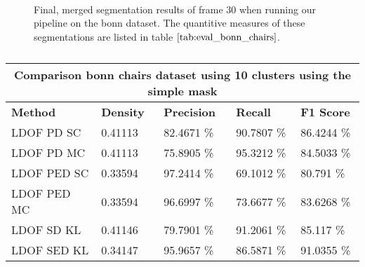 \begin{figure}[H]
\begin{center}
~
~
\end{center}
\caption[Simple Merged Segments Bonn Chairs]{Final, merged segmentation results of frame 30 when running our pipeline on the bonn dataset. The quantitive measures of these segmentations are listed in table $\ref{tab:eval_bonn_chairs}$.}
\label{fig:eval_bonn_chairs_c_10_simple}
\end{figure}

\begin{table}[H]
\centering
\begin{tabular}{|l|l|l|l|l|}
\hline
\multicolumn{5}{|c|}{Comparison bonn chairs dataset using 10 clusters using the simple mask}                        \\ \hline
\textbf{Method} & \textbf{Density} & \textbf{Precision} & \textbf{Recall} & \textbf{F1 Score} \\ \hline
LDOF PD SC & 0.41113 & 82.4671 \%   & 90.7807 \%     & 86.4244 \% \\ \hline
LDOF PD MC & 0.41113 & 75.8905 \%   & 95.3212 \%     & 84.5033 \%  \\ \hline
LDOF PED SC & 0.33594 & 97.2414 \%   & 69.1012 \%     & 80.791 \%  \\ \hline
LDOF PED MC & 0.33594 & 96.6997 \%   & 73.6677 \%     & 83.6268 \%  \\ \hline              
LDOF SD KL & 0.41146 & 79.7901 \%   & 91.2061 \%     & 85.117 \%    \\ \hline
LDOF SED KL & 0.34147 & 95.9657 \%   & 86.5871 \%     & 91.0355 \%  \\ \hline
\end{tabular}
\caption[Bonn Chairs Merged 10 Clusters]{}
\label{tab:eval_bonn_chairs_c_10_simple}
\end{table}


